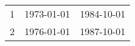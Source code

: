 % 
\begin{tabular}{ccc}
  \hline
  \hline
1 & 1973-01-01 & 1984-10-01 \\ 
  2 & 1976-01-01 & 1987-10-01 \\ 
   \hline
\end{tabular}
